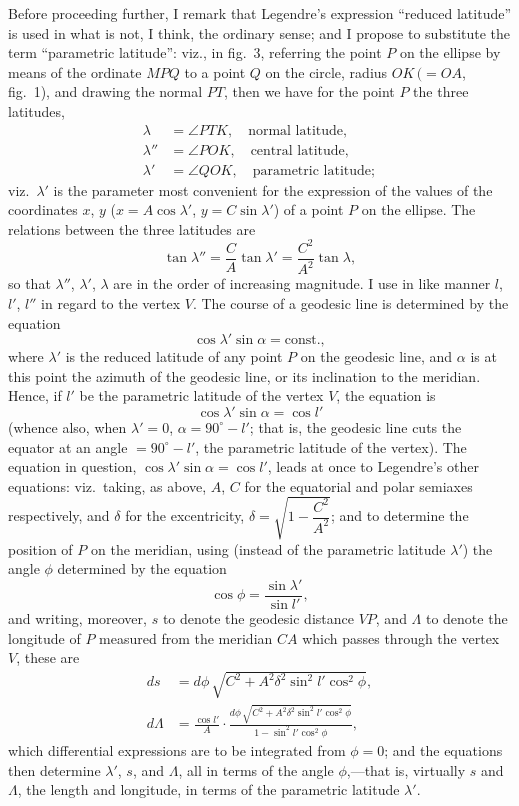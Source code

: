 \documentclass[11pt,a4paper]{article}
\begin{document}
Before proceeding further, I remark that Legendre's expression ``reduced
latitude'' is used in what is not, I think, the ordinary sense; and I propose
to substitute the term ``parametric latitude'': viz., in fig.~3, referring the
point $P$ on the ellipse by means of the ordinate $MPQ$ to a point $Q$ on the
circle, radius $OK\,(= OA$, fig.~1), and drawing the normal $PT$, then we have
for the point $P$ the three latitudes,
\begin{align*}
\lambda   &= \angle PTK, \quad\text{normal latitude}, \\
\lambda'' &= \angle POK, \quad\text{central latitude}, \\
\lambda'  &= \angle QOK, \quad\text{parametric latitude};
\end{align*}
viz.\ $\lambda'$ is the parameter most convenient for the expression of the
values of the coordinates $x$, $y$ ($x = A\cos\lambda'$, $y = C\sin\lambda'$)
of a point $P$ on the ellipse.  The relations between the three latitudes are
\[
\tan\lambda'' = \frac{C}{A}\tan\lambda' = \frac{C^2}{A^2}\tan\lambda,
\]
so that $\lambda''$, $\lambda'$, $\lambda$ are in the order of increasing
magnitude.  I use in like manner $l$, $l'$, $l''$ in regard to the vertex $V$.
The course of a geodesic line is determined by the equation
\[
\cos\lambda'\sin\alpha = \text{const.},
\]
where $\lambda'$ is the reduced latitude of any point $P$ on the geodesic
line, and $\alpha$ is at this point the azimuth of the geodesic line, or its
inclination to the meridian.  Hence, if $l'$ be the parametric latitude of the
vertex $V$, the equation is
\[
\cos\lambda'\sin\alpha = \cos l'
\]
(whence also, when $\lambda' = 0$, $\alpha = 90^\circ - l'$; that is, the
geodesic line cuts the equator at an angle $= 90^\circ - l'$, the parametric
latitude of the vertex).  The equation in question,
$\cos\lambda'\sin\alpha = \cos l'$, leads at once to Legendre's other
equations: viz.\ taking, as above, $A$, $C$ for the equatorial and polar
semiaxes respectively, and $\delta$ for the excentricity,
$\delta = \sqrt{1 - \dfrac{C^2}{A^2}}$; and to determine the position of $P$
on the meridian, using (instead of the parametric latitude $\lambda'$) the
angle $\phi$ determined by the equation
\[
\cos\phi = \frac{\sin\lambda'}{\sin l'},
\]
and writing, moreover, $s$ to denote the geodesic distance $VP$, and $\Lambda$
to denote the longitude of $P$ measured from the meridian $CA$ which passes
through the vertex $V$, these are
\begin{align*}
ds      &= d\phi\,\sqrt{C^2 + A^2\delta^2\sin^2 l'\cos^2\phi}, \\
d\Lambda &= \frac{\cos l'}{A}\cdot
\frac{d\phi\,\sqrt{C^2 + A^2\delta^2\sin^2 l'\cos^2\phi}}{1 - \sin^2 l'\cos^2\phi},
\end{align*}
which differential expressions are to be integrated from $\phi = 0$; and the
equations then determine $\lambda'$, $s$, and $\Lambda$, all in terms of the
angle $\phi$,---that is, virtually $s$ and $\Lambda$, the length and longitude,
in terms of the parametric latitude $\lambda'$.
\end{document}
